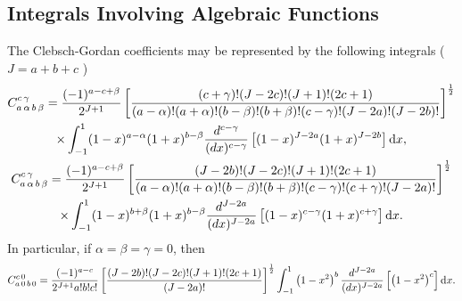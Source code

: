 \subsection{Integrals Involving Algebraic Functions}\label{sec:8.3.1}
The Clebsch-Gordan coefficients may be represented by the following integrals \cite{ref041} ( $J=a+b+c$ )
\begin{gather}
C_{a\,\alpha\,b\,\beta}^{c\,\gamma}=\frac{(-1)^{a-c+\beta}}{2^{J+1}}\left[\frac{(c+\gamma)!(J-2 c)!(J+1)!(2 c+1)}{(a-\alpha)!(a+\alpha)!(b-\beta)!(b+\beta)!(c-\gamma)!(J-2 a)!(J-2 b)!}\right]^{\frac{1}{2}}  \notag\\
\times \int_{-1}^{1}(1-x)^{a-\alpha}(1+x)^{b-\beta} \frac{d^{c-\gamma}}{(d x)^{c-\gamma}}\left[(1-x)^{J-2 a}(1+x)^{J-2 b}\right]\mathrm{d} x, \label{eq:8:3:1}\\
C_{a\,\alpha\,b\,\beta}^{c\,\gamma}=\frac{(-1)^{a-c+\beta}}{2^{J+1}}\left[\frac{(J-2 b)!(J-2 c)!(J+1)!(2 c+1)}{(a-\alpha)!(a+\alpha)!(b-\beta)!(b+\beta)!(c-\gamma)!(c+\gamma)!(J-2 a)!}\right]^{\frac{1}{2}}  \notag\\
\times \int_{-1}^{1}(1-x)^{b+\beta}(1+x)^{b-\beta} \frac{d^{J-2 a}}{(d x)^{J-2 a}}\left[(1-x)^{c-\gamma}(1+x)^{c+\gamma}\right]\mathrm{d} x. \label{eq:8:3:2}
\end{gather}
In particular, if $\alpha=\beta=\gamma=0$, then
\begin{equation}
C_{a\,0\,b\,0}^{c\,0}=\frac{(-1)^{a-c}}{2^{J+1} a!b!c!}\left[\frac{(J-2 b)!(J-2 c)!(J+1)!(2 c+1)}{(J-2 a)!}\right]^{\frac{1}{2}} \int_{-1}^{1}\left(1-x^{2}\right)^{b} \frac{d^{J-2 a}}{(d x)^{J-2 a}}\left[\left(1-x^{2}\right)^{c}\right]\mathrm{d} x. \label{eq:8:3:3}
\end{equation}
